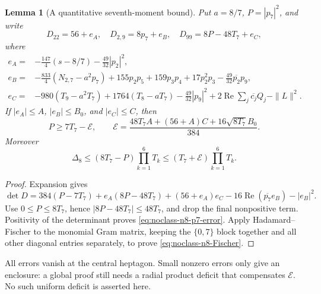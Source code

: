 \documentclass[11pt]{article}
\newtheorem{lemma}[theorem]{Lemma}
\theoremstyle{remark}
\numberwithin{equation}{section}
\begin{document}
\begin{lemma}[A quantitative seventh-moment bound]
\label{lem:noclass-n8-29-error}
Put $a=8/7$, $P=|p_7|^2$, and write
\[
 D_{22}=56+e_A,\quad D_{2,9}=8p_7+e_B,
 \quad D_{99}=8P-48T_7+e_C,
\]
where
\begin{align*}
 e_A={}&-\frac{147}{4}(s-8/7)-\frac{49}{32}|p_2|^2,\\
 e_B={}&-\frac{833}{4}(N_{2,7}-a^2p_7)+155p_2p_5+159p_3p_4
 +17p_2^2p_3-\frac{49}{32}\overline{p_2}p_9,\\
 e_C={}&-980(T_9-a^2T_7)+1764(T_8-aT_7)-\frac{49}{32}|p_9|^2
 +2\operatorname{Re}\sum_j\overline{c_j}Q_j-\|L\|^2.
\end{align*}
If $|e_A|\le A$, $|e_B|\le B_0$, and $|e_C|\le C$, then
\begin{equation}\label{eq:noclass-n8-p7-error}
 P\ge7T_7-\mathcal E,\qquad
 \mathcal E=\frac{48T_7A+(56+A)C+16\sqrt{8T_7}B_0}{384}.
\end{equation}
Moreover
\begin{equation}\label{eq:noclass-n8-Fischer}
 \Delta_8\le(8T_7-P)\prod_{k=1}^6T_k
 \le(T_7+\mathcal E)\prod_{k=1}^6T_k.
\end{equation}
\end{lemma}
\begin{proof}
Expansion gives
\[
 \det D=384(P-7T_7)+e_A(8P-48T_7)+(56+e_A)e_C
 -16\operatorname{Re}(\overline{p_7}e_B)-|e_B|^2.
\]
Use $0\le P\le8T_7$, hence $|8P-48T_7|\le48T_7$, and drop
the final nonpositive term. Positivity of the determinant proves
\eqref{eq:noclass-n8-p7-error}. Apply Hadamard--Fischer to the
monomial Gram matrix, keeping the $\{0,7\}$ block together and
all other diagonal entries separately, to prove
\eqref{eq:noclass-n8-Fischer}.
\end{proof}
All errors vanish at the central heptagon. Small nonzero errors only
give an enclosure: a global proof still needs a radial product deficit
that compensates $\mathcal E$. No such uniform deficit is asserted here.
\end{document}
